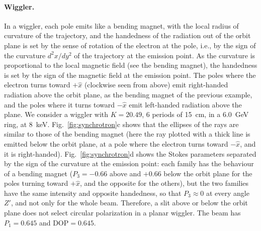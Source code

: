 \documentclass{iucr}
\begin{document}
\paragraph{Wiggler.}
In a wiggler, each pole emits like a bending magnet, with the local radius of curvature of the trajectory, and the handedness of the radiation out of the orbit plane is set by the sense of rotation of the electron at the pole, i.e., by the sign of the curvature $d^2x/dy^2$ of the trajectory at the emission point. As the curvature is proportional to the local magnetic field (see the bending magnet), the handedness is set by the sign of the magnetic field at the emission point. The poles where the electron turns toward $+\hat{x}$ (clockwise seen from above) emit right-handed radiation above the orbit plane, as the bending magnet of the previous example, and the poles where it turns toward $-\hat{x}$ emit left-handed radiation above the plane. We consider a wiggler with $K=20.49$, 6 periods of 15~cm, in a 6.0~GeV ring, at 8~keV. Fig.~\ref{fig:synchrotron}c shows that the ellipses of the rays are similar to those of the bending magnet (here the ray plotted with a thick line is emitted below the orbit plane, at a pole where the electron turns toward $-\hat{x}$, and it is right-handed). Fig.~\ref{fig:synchrotron}d shows the Stokes parameters separated by the sign of the curvature at the emission point: each family has the behaviour of a bending magnet ($P_3=-0.66$ above and $+0.66$ below the orbit plane for the poles turning toward $+\hat{x}$, and the opposite for the others), but the two families have the same intensity and opposite handedness, so that $P_3\approx0$ at every angle $Z'$, and not only for the whole beam. Therefore, a slit above or below the orbit plane does not select circular polarization in a planar wiggler. The beam has $P_1=0.645$ and DOP$=0.645$.
\end{document}

